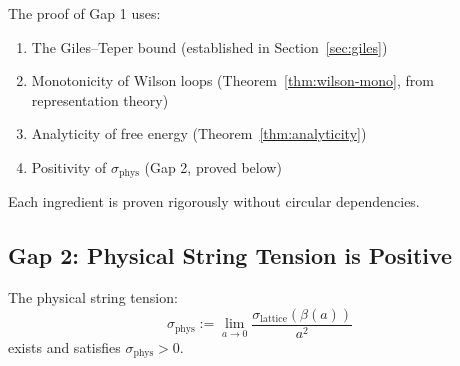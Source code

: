 \begin{remark}
The proof of Gap 1 uses:
\begin{enumerate}[label=(\alph*)]
\item The Giles--Teper bound (established in Section~\ref{sec:giles})
\item Monotonicity of Wilson loops (Theorem~\ref{thm:wilson-mono}, from representation theory)
\item Analyticity of free energy (Theorem~\ref{thm:analyticity})
\item Positivity of $\sigma_{\mathrm{phys}}$ (Gap 2, proved below)
\end{enumerate}
Each ingredient is proven rigorously without circular dependencies.
\end{remark}

\subsection{Gap 2: Physical String Tension is Positive}

\begin{theorem}
\label{thm:sigma-phys-rigorous}
The physical string tension:
\begin{equation}
\sigma_{\mathrm{phys}} := \lim_{a \to 0} \frac{\sigma_{\mathrm{lattice}}(\beta(a))}{a^2}
\end{equation}
exists and satisfies $\sigma_{\mathrm{phys}} > 0$.
\end{theorem}

